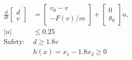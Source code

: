 \documentclass[preview]{standalone}
\begin{document}
\begin{align*}
\frac{d}{dt}\begin{bmatrix}d\\ v\end{bmatrix} &= \begin{bmatrix}v_0 - v\\ -F(v)/m\end{bmatrix} + \begin{bmatrix}0\\g_0\end{bmatrix}u, \\ |u| &\leq 0.25\\ \text{Safety: } & d \geq 1.8 v\\ &h(x) = x_1 - 1.8 x_2 \geq 0
\end{align*}
\end{document}
